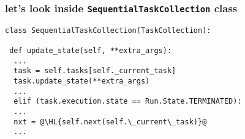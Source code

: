 \documentclass[english,serif,mathserif,xcolor=pdftex,dvipsnames,table]{beamer}
\begin{document}
\begin{frame}[fragile]
  \frametitle{let's look inside \texttt{SequentialTaskCollection} class}
  \begin{lstlisting}
class SequentialTaskCollection(TaskCollection):

 def update_state(self, **extra_args):
  ...
  task = self.tasks[self._current_task]
  task.update_state(**extra_args)
  ...
  elif (task.execution.state == Run.State.TERMINATED):
  ...
  nxt = @\HL{self.next(self.\_current\_task)}@
  ...
  \end{lstlisting}
\end{frame}
\end{document}
